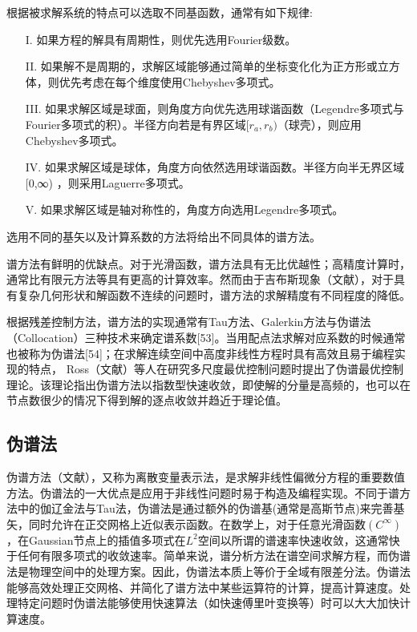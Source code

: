 根据被求解系统的特点可以选取不同基函数，通常有如下规律:
\begin{itemize}
    \item [I.] 如果方程的解具有周期性，则优先选用Fourier级数。
    \item [II.] 如果解不是周期的，求解区域能够通过简单的坐标变化化为正方形或立方体，则优先考虑在每个维度使用Chebyshev多项式。
    \item [III.] 如果求解区域是球面，则角度方向优先选用球谐函数（Legendre多项式与Fourier多项式的积）。半径方向若是有界区域$[r_a,r_b )$（球壳），则应用Chebyshev多项式。
    \item [IV.] 如果求解区域是球体，角度方向依然选用球谐函数。半径方向半无界区域 [0,∞)  ，则采用Laguerre多项式。
    \item [V.] 如果求解区域是轴对称性的，角度方向选用Legendre多项式。
\end{itemize}
选用不同的基矢以及计算系数的方法将给出不同具体的谱方法。


谱方法有鲜明的优缺点。对于光滑函数，谱方法具有无比优越性；高精度计算时，通常比有限元方法等具有更高的计算效率。然而由于吉布斯现象（文献），对于具有复杂几何形状和解函数不连续的问题时，谱方法的求解精度有不同程度的降低。

根据残差控制方法，谱方法的实现通常有Tau方法、Galerkin方法与伪谱法（Collocation）三种技术来确定谱系数[53]。当用配点法求解对应系数的时候通常也被称为伪谱法[54]；在求解连续空间中高度非线性方程时具有高效且易于编程实现的特点，
Ross（文献）等人在研究多尺度最优控制问题时提出了伪谱最优控制理论。该理论指出伪谱方法以指数型快速收敛，即使解的分量是高频的，也可以在节点数很少的情况下得到解的逐点收敛并趋近于理论值。

\subsection{伪谱法}
\label{伪谱法}

伪谱方法（文献），又称为离散变量表示法，是求解非线性偏微分方程的重要数值方法。伪谱法的一大优点是应用于非线性问题时易于构造及编程实现。不同于谱方法中的伽辽金法与Tau法，伪谱法是通过额外的伪谱基(通常是高斯节点)来完善基矢，同时允许在正交网格上近似表示函数。在数学上，对于任意光滑函数$(C^{\infty})$，在Gaussian节点上的插值多项式在$L^2$空间以所谓的谱速率快速收敛，这通常快于任何有限多项式的收敛速率。简单来说，谱分析方法在谱空间求解方程，而伪谱法是物理空间中的处理方案。因此，伪谱法本质上等价于全域有限差分法。伪谱法能够高效处理正交网格、并简化了谱方法中某些运算符的计算，提高计算速度。处理特定问题时伪谱法能够使用快速算法（如快速傅里叶变换等）时可以大大加快计算速度。


